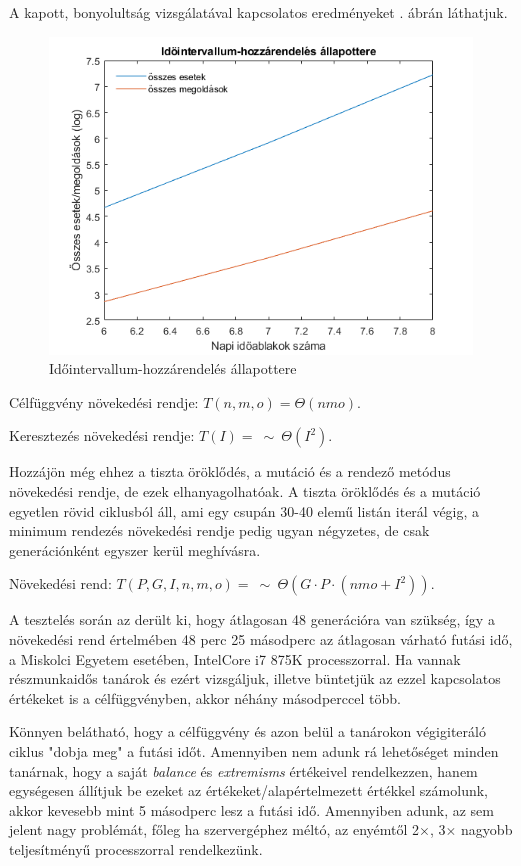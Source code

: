 A kapott, bonyolultság vizsgálatával kapcsolatos eredményeket . ábrán láthatjuk.

\begin{figure}[h!]
	\includegraphics[width=\linewidth]{images/idointervallum.png}
	\caption{Időintervallum-hozzárendelés állapottere}
	\label{fig:idointervallum}
\end{figure}

Célfüggvény növekedési rendje: $T(n,m,o)=\Theta(nmo)$.

Keresztezés növekedési rendje: $T(I)=\ \sim \ \Theta(I^2)$.

Hozzájön még ehhez a tiszta öröklődés, a mutáció és a rendező metódus növekedési rendje, de ezek elhanyagolhatóak. A tiszta öröklődés és a mutáció egyetlen rövid ciklusból áll, ami egy csupán 30-40 elemű listán iterál végig, a minimum rendezés növekedési rendje pedig ugyan négyzetes, de csak generációnként egyszer kerül meghívásra.

Növekedési rend: $T(P,G,I,n,m,o)=\ \sim \ \Theta(G \cdot P \cdot (nmo+I^2))$.

A tesztelés során az derült ki, hogy átlagosan 48 generációra van szükség, így a növekedési rend értelmében 48 perc 25 másodperc az átlagosan várható futási idő, a Miskolci Egyetem esetében, IntelCore i7 875K processzorral. Ha vannak részmunkaidős tanárok és ezért vizsgáljuk, illetve büntetjük az ezzel kapcsolatos értékeket is a célfüggvényben, akkor néhány másodperccel több.

Könnyen belátható, hogy a célfüggvény és azon belül a tanárokon végigiteráló ciklus "dobja meg" a futási időt. Amennyiben nem adunk rá lehetőséget minden tanárnak, hogy a saját \textit{balance} és \textit{extremisms} értékeivel rendelkezzen, hanem egységesen állítjuk be ezeket az értékeket/alapértelmezett értékkel számolunk, akkor kevesebb mint 5 másodperc lesz a futási idő. Amennyiben adunk, az sem jelent nagy problémát, főleg ha szervergéphez méltó, az enyémtől 2$\times$, 3$\times$ nagyobb teljesítményű processzorral rendelkezünk.

